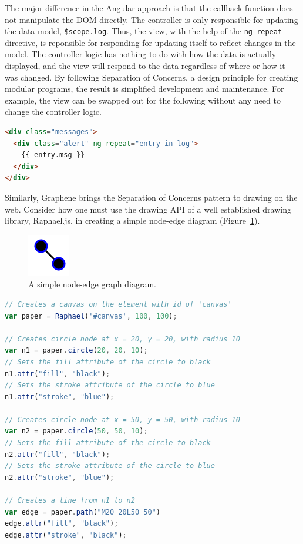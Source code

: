 The major difference in the Angular approach is that the callback function does not manipulate the DOM directly.
The controller is only responsible for updating the data model, \texttt{\$scope.log}.
Thus, the view, with the help of the \texttt{ng-repeat} directive, is reponsible for responding for updating itself to reflect changes in the model.
The controller logic has nothing to do with how the data is actually displayed, and the view will respond to the data regardless of where or how it was changed.
By following Separation of Concerns, a design principle for creating modular programs, the result is simplified development and maintenance.
For example, the view can be swapped out for the following without any need to change the controller logic.

\begin{lstlisting}[language=html]
<div class="messages">
  <div class="alert" ng-repeat="entry in log">
    {{ entry.msg }}
  </div>
</div>
\end{lstlisting}

Similarly, Graphene brings the Separation of Concerns pattern to drawing on the web.
Consider how one must use the drawing API of a well established drawing library, Raphael.js. \autocite{sencha2014raphael} in creating a simple node-edge diagram (Figure~\ref{fig:graphene-simple}).

\begin{figure}
  \centering
  \includegraphics[width=70px,natwidth=610,natheight=642]{images/graphene-simple-70x70.png}
  \caption{A simple node-edge graph diagram.}
  \label{fig:graphene-simple}
\end{figure}

\begin{lstlisting}[language=JavaScript]
// Creates a canvas on the element with id of 'canvas'
var paper = Raphael('#canvas', 100, 100);

// Creates circle node at x = 20, y = 20, with radius 10
var n1 = paper.circle(20, 20, 10);
// Sets the fill attribute of the circle to black
n1.attr("fill", "black");
// Sets the stroke attribute of the circle to blue
n1.attr("stroke", "blue");

// Creates circle node at x = 50, y = 50, with radius 10
var n2 = paper.circle(50, 50, 10);
// Sets the fill attribute of the circle to black
n2.attr("fill", "black");
// Sets the stroke attribute of the circle to blue
n2.attr("stroke", "blue");

// Creates a line from n1 to n2
var edge = paper.path("M20 20L50 50")
edge.attr("fill", "black");
edge.attr("stroke", "black");
\end{lstlisting}

